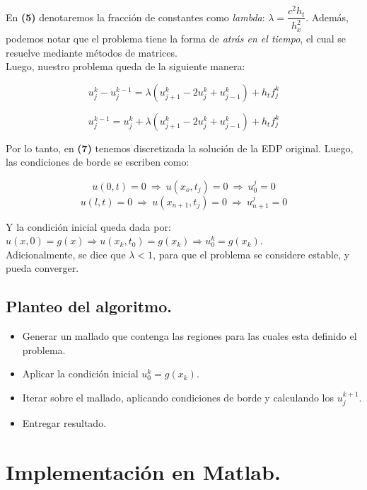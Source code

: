 \documentclass[12pt,letterpaper]{article}
\begin{document}
En \textbf{(5)} denotaremos la fracción de constantes como \textit{lambda}: $\lambda = \dfrac{c^2h_t}{h^2_x}$. Además, podemos notar que el problema tiene la forma de \textit{atrás en el tiempo}, el cual se resuelve mediante métodos de matrices.\\

Luego, nuestro problema queda de la siguiente manera:

\begin{equation}u_j^{k} - u_j^{k-1} = \lambda (u_{j+1}^k - 2u_j^k + u_{j-1}^k) + h_tf_j^k\end{equation}

\begin{equation}u_j^{k-1} = u_j^k + \lambda (u_{j+1}^k - 2u_j^k + u_{j-1}^k) + h_tf_j^k\end{equation}

Por lo tanto, en \textbf{(7)} tenemos discretizada la solución de la EDP original. Luego, las condiciones de borde se escriben como:

\begin{equation*}u(0,t)=0\ \Rightarrow\ u(x_o,t_j)=0\ \Rightarrow\ u_0^j=0 \end{equation*}
\begin{equation*}u(l,t)=0\ \Rightarrow\ u(x_{n+1},t_j)=0\ \Rightarrow\ u_{n+1}^j=0 \end{equation*}

Y la condición inicial queda dada por: $u(x,0)=g(x) \Rightarrow u(x_k,t_0)=g(x_k) \Rightarrow u_0^k=g(x_k)$.\\

Adicionalmente, se dice que $\lambda<1$, para que el problema se considere estable, y pueda converger.

\subsection{Planteo del algoritmo.}
\begin{itemize}
	\item Generar un mallado que contenga las regiones para las cuales esta definido el problema.
	\item Aplicar la condición inicial $u_0^k=g(x_k)$.
	\item Iterar sobre el mallado, aplicando condiciones de borde y calculando los $u_j^{k+1}$.
	\item Entregar resultado.
\end{itemize}
\newpage

\section{Implementación en Matlab.}
\end{document}
